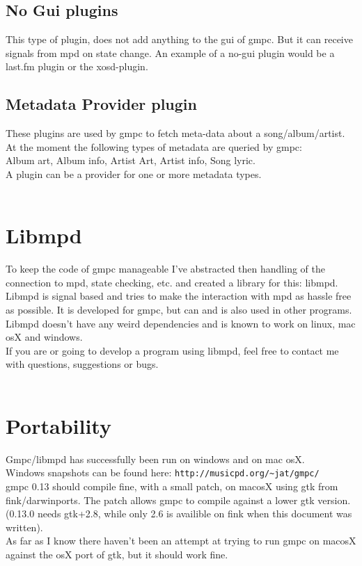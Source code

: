 \documentclass{article}
\begin{document}
\subsection {No Gui plugins}
This type of plugin, does not add anything to the gui of gmpc. But it can receive signals from mpd on state change. An example of a no-gui plugin would be a last.fm plugin or the xosd-plugin.\\
\subsection {Metadata Provider plugin}
These plugins are used by gmpc to fetch meta-data about a song/album/artist. At the moment the following types of metadata are queried by gmpc:\\
Album art, Album info, Artist Art, Artist info, Song lyric.\\ A plugin can be a provider for one or more metadata types.\\
\\
\section {Libmpd}
To keep the code of gmpc manageable I've abstracted then handling of the connection to mpd, state checking, etc. and created a library for this: libmpd. Libmpd is signal based and tries to make the interaction with mpd as hassle free as possible. It is developed for gmpc, but can and is also used in other programs. Libmpd doesn't have any weird dependencies and is known to work on linux, mac osX and windows.\\
If you are or going to develop a program using libmpd, feel free to contact me with questions, suggestions or bugs.\\
\\

\section {Portability}
Gmpc/libmpd has successfully been run on windows and on mac osX. \\
Windows snapshots can be found here: \verb+http://musicpd.org/~jat/gmpc/+\\
gmpc 0.13 should compile fine, with a small patch, on macosX using gtk from fink/darwinports. The patch allows gmpc to compile against a lower gtk version. (0.13.0 needs gtk+2.8, while only 2.6 is availible on fink when this document was written).\\
As far as I know there haven't been an attempt at trying to run gmpc on macosX against the osX port of gtk, but it should work fine.\\
\end{document}
